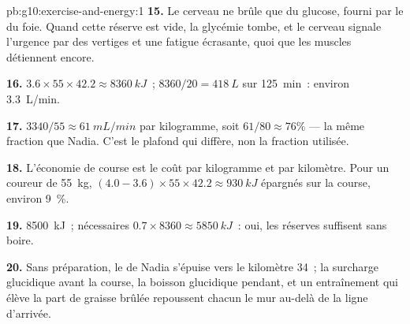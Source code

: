 \begin{solution}{pb:g10:exercise-and-energy:1}
\textbf{15.} Le cerveau ne brûle que du glucose, fourni par le
 du foie. Quand cette réserve est vide, la glycémie tombe, et
le cerveau signale l'urgence par des vertiges et une fatigue
écrasante, quoi que les muscles détiennent encore.

\textbf{16.} $3.6 \times 55 \times 42.2 \approx \qty{8360}{kJ}$~;
$8360/20 = \qty{418}{L}$ sur \qty{125}{min}~: environ \qty{3.3}{L/min}.

\textbf{17.} $3340/55 \approx \qty{61}{mL/min}$ par kilogramme, soit
$61/80 \approx 76\%$ --- la même fraction que Nadia. C'est le plafond
qui diffère, non la fraction utilisée.

\textbf{18.} L'économie de course est le coût par kilogramme et par
kilomètre. Pour un coureur de \qty{55}{kg},
$(4.0 - 3.6) \times 55 \times 42.2 \approx
\qty{930}{kJ}$ épargnés sur la course, environ 9~\%.

\textbf{19.}  \qty{8500}{kJ}~;  nécessaires $0.7 \times
8360 \approx \qty{5850}{kJ}$~: oui, les réserves suffisent sans boire.

\textbf{20.} Sans préparation, le  de Nadia s'épuise vers le
kilomètre 34~; la surcharge glucidique avant la course, la boisson
glucidique pendant, et un entraînement qui élève la part de graisse
brûlée repoussent chacun le mur au-delà de la ligne d'arrivée.
\end{solution}
